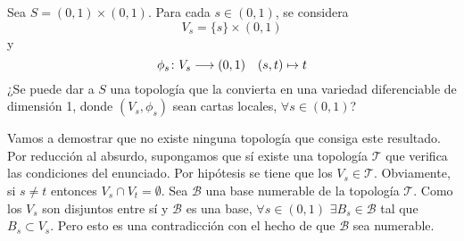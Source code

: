\documentclass[twoside]{article}
\newcommand{\T}{\mathcal{T}}
\begin{document}
\begin{ejercicio}{1.6}
Sea $S=(0,1)\times (0,1)$. Para cada $s\in(0,1)$, se considera
\[
V_s=\{s\}\times(0,1)
\]
y
\[
\phi_s\colon{V_s}\longrightarrow{(0,1)}\quad (s,t)\mapsto t
\]
¿Se puede dar a $S$ una topología que la convierta en una variedad diferenciable de dimensión 1, donde $(V_s, \phi_s)$ sean cartas locales, $\forall s\in (0, 1)$?
\begin{sol}
Vamos a demostrar que no existe ninguna topología que consiga este resultado. Por reducción al absurdo, supongamos que sí existe una topología $\mathcal{T}$ que verifica las condiciones del enunciado. Por hipótesis se tiene que los $V_s \in \T$. Obviamente, si $s\neq t$ entonces $V_s \cap V_t =\emptyset$. Sea $\mathcal{B}$ una base numerable de la topología $\T$. Como los $V_s$ son disjuntos entre sí y $\mathcal{B}$ es una base, $\forall s\in (0,1)$ $\exists B_s \in \mathcal{B}$ tal que $B_s\subset V_s$. Pero esto es una contradicción con el hecho de que $\mathcal{B}$ sea numerable.
\end{sol}
\end{ejercicio}
\end{document}
